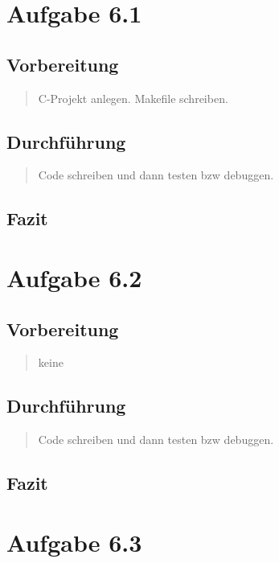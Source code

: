 \section{Aufgabe 6.1}
	\subsection{Vorbereitung}
		\begin{quote}
			C-Projekt anlegen.
			Makefile schreiben.
		\end{quote}
	\subsection{Durchführung}
		\begin{quote}
			Code schreiben und dann testen bzw debuggen.
		\end{quote}
	\subsection{Fazit}
		\begin{quote}
			
		\end{quote}

\section{Aufgabe 6.2}
	\subsection{Vorbereitung}
		\begin{quote}
			keine
		\end{quote}
	\subsection{Durchführung}
		\begin{quote}
			Code schreiben und dann testen bzw debuggen.
		\end{quote}
	\subsection{Fazit}
		\begin{quote}
			
		\end{quote}

\section{Aufgabe 6.3}
